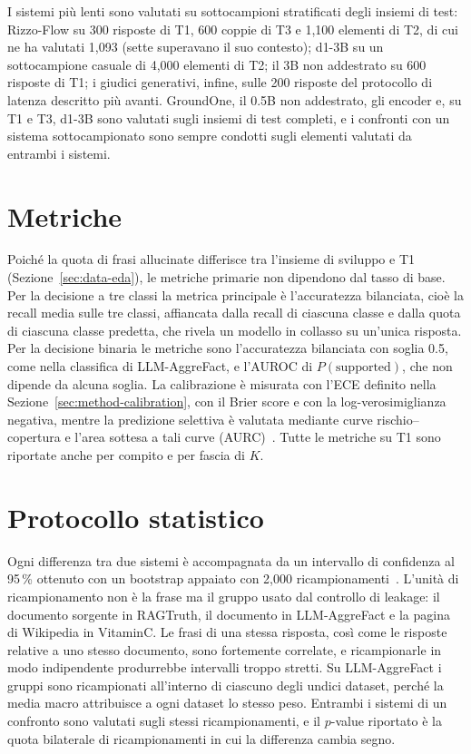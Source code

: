 I sistemi più lenti sono valutati su sottocampioni stratificati degli insiemi di test: Rizzo-Flow su 300 risposte di T1,
600 coppie di T3 e 1{,}100 elementi di T2, di cui ne ha valutati 1{,}093 (sette superavano il suo contesto); d1-3B su un
sottocampione casuale di 4{,}000 elementi di T2; il 3B non addestrato su 600 risposte di T1; i giudici generativi, infine,
sulle 200 risposte del protocollo di latenza descritto più avanti. GroundOne, il 0.5B non addestrato, gli encoder e, su T1
e T3, d1-3B sono valutati sugli insiemi di test completi, e i confronti con un sistema sottocampionato sono sempre
condotti sugli elementi valutati da entrambi i sistemi.

\section{Metriche}
\label{sec:setup-metrics}

Poiché la quota di frasi allucinate differisce tra l'insieme di sviluppo e T1 (Sezione~\ref{sec:data-eda}), le metriche
primarie non dipendono dal tasso di base. Per la decisione a tre classi la metrica principale è l'accuratezza bilanciata,
cioè la recall media sulle tre classi, affiancata dalla recall di ciascuna classe e dalla quota di ciascuna classe
predetta, che rivela un modello in collasso su un'unica risposta. Per la decisione binaria le metriche sono l'accuratezza
bilanciata con soglia 0.5, come nella classifica di LLM-AggreFact, e l'AUROC di $P(\text{supported})$, che non dipende da
alcuna soglia. La calibrazione è misurata con l'ECE definito nella Sezione~\ref{sec:method-calibration}, con il Brier
score e con la log-verosimiglianza negativa, mentre la predizione selettiva è valutata mediante curve rischio--copertura e
l'area sottesa a tali curve (AURC)~\cite{geifman2017selective}. Tutte le metriche su T1 sono riportate anche per compito e
per fascia di $K$.

\section{Protocollo statistico}
\label{sec:setup-statistics}

Ogni differenza tra due sistemi è accompagnata da un intervallo di confidenza al 95\,\% ottenuto con un bootstrap
appaiato con 2{,}000 ricampionamenti~\cite{koehn2004significance,bergkirkpatrick2012significance,dror2018hitchhiker}.
L'unità di ricampionamento non è la frase ma il gruppo usato dal controllo di leakage: il documento sorgente in RAGTruth,
il documento in LLM-AggreFact e la pagina di Wikipedia in VitaminC. Le frasi di una stessa risposta, così come le risposte
relative a uno stesso documento, sono fortemente correlate, e ricampionarle in modo indipendente produrrebbe intervalli
troppo stretti. Su LLM-AggreFact i gruppi sono ricampionati all'interno di ciascuno degli undici dataset, perché la media
macro attribuisce a ogni dataset lo stesso peso. Entrambi i sistemi di un confronto sono valutati sugli stessi
ricampionamenti, e il $p$-value riportato è la quota bilaterale di ricampionamenti in cui la differenza cambia segno.

